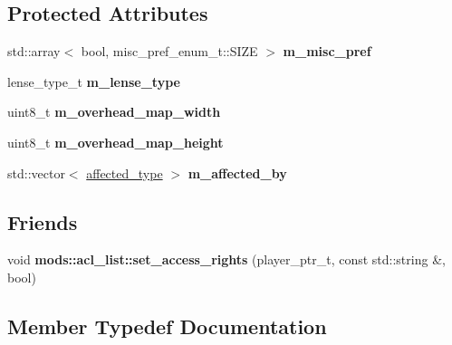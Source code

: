\subsection*{Protected Attributes}
\begin{DoxyCompactItemize}
\item 
\mbox{\label{classmods_1_1player_a3f506528f2633149d6577a628b4fa86a}} 
std\+::array$<$ bool, misc\+\_\+pref\+\_\+enum\+\_\+t\+::\+S\+I\+ZE $>$ {\bfseries m\+\_\+misc\+\_\+pref}
\item 
\mbox{\label{classmods_1_1player_a61668c66280f178e14b5aac9f6f7bf2d}} 
lense\+\_\+type\+\_\+t {\bfseries m\+\_\+lense\+\_\+type}
\item 
\mbox{\label{classmods_1_1player_aea958890ec05b191ee9c3df20d406a04}} 
uint8\+\_\+t {\bfseries m\+\_\+overhead\+\_\+map\+\_\+width}
\item 
\mbox{\label{classmods_1_1player_a74c1aa460bf10298e04df0819de4976d}} 
uint8\+\_\+t {\bfseries m\+\_\+overhead\+\_\+map\+\_\+height}
\item 
\mbox{\label{classmods_1_1player_a815275e6ade43c0c7841e3978f4aaec4}} 
std\+::vector$<$ \hyperlink{structaffected__type}{affected\+\_\+type} $>$ {\bfseries m\+\_\+affected\+\_\+by}
\end{DoxyCompactItemize}
\subsection*{Friends}
\begin{DoxyCompactItemize}
\item 
\mbox{\label{classmods_1_1player_a670733959fee649b6b7bfbae5ea551a2}} 
void {\bfseries mods\+::acl\+\_\+list\+::set\+\_\+access\+\_\+rights} (player\+\_\+ptr\+\_\+t, const std\+::string \&, bool)
\end{DoxyCompactItemize}


\subsection{Member Typedef Documentation}
\mbox{\label{classmods_1_1player_a98e6f1c1529e3034d1c6e9a48475bc6b}} 
